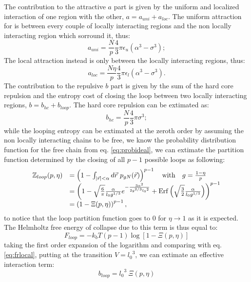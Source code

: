 \documentclass[12pt,a4paper,notitlepage]{article}
\begin{document}
The contribution to the attractive $a$ part is given by the uniform
and localized interaction of one region with the other, $a = a_{uni} +
a_{loc}$. The uniform attraction for is between every couple of
locally interacting regions and the non locally interacting region
which sorround it, thus:
\begin{equation}
  a_{uni} = \frac{N}{p} \frac{4}{3} \pi \epsilon_u (\alpha^3 -
  \sigma^3);
\end{equation}
The local attraction instead is only between the locally interacting
regions, thus:
\begin{equation}
  a_{loc} =  \frac{N \eta}{p} \frac{4}{3} \pi \epsilon_l (\alpha^3 -
  \sigma^3). 
\end{equation}
The contribution to the repulsive $b$ part is given by the sum of the
hard core repulsion and the entropy cost of closing the loop between
two locally interacting regions, $b = b_{hc} + b_{loop}$. The hard
core repulsion can be extimated as:
\begin{equation}
  b_{hc} = \frac{N}{p} \frac{4}{3} \pi \sigma^3;
\end{equation}
while the looping entropy can be extimated at the zeroth order by
assuming the non locally interacting chains to be free, we know the
probability distribution function for the free chain from
eq. \ref{eq:probideal}, we can extimate the partition function
determined by the closing of all $p - 1$ possible loops as following:
\begin{equation}
\begin{array}{r l}
  \mathbb{Z}_{loop}(p, \eta) &=
      \left(1 - \int_{|\vec r| < \alpha} d \vec r\ p_{gN}(\vec r)
      \right)^{p-1} \quad \mathrm{with} \quad g = \frac{1 - \eta}{p}
\\ &=
\left(
  1 - \sqrt{\frac{6}{\pi}}\frac{\alpha}{l_0 g^{1/3}}
  e^{-\frac{3\alpha^2}{2 g^{2/3} {l_0}^2}} +
  \mathrm{Erf}\left( \sqrt{\frac{3}{2}} \frac{\alpha}{l_0
      g^{1/3}}\right) \right)^{p-1}
\\ &= \left(1 - \Xi(p, \eta)
\right)^{p-1},
\end{array}
\end{equation}
to notice that the loop partition function goes to $0$ for $\eta \to
1$ as it is expected.
The Helmholtz free energy of collapse due to this term is thus equal
to:
\begin{equation}
  F_{loop} = -k_bT (p - 1) \log \left[1 - \Xi(p, \eta) \right]
\end{equation}
taking the first order expansion of the logarithm and comparing with
eq. \ref{eq:frlocal}, putting at the transition $V = {l_0}^3$, we can
extimate an effective interaction term: 
\begin{equation}
b_{loop} = {l_0}^3\ \Xi(p, \eta)
\end{equation}
\end{document}
